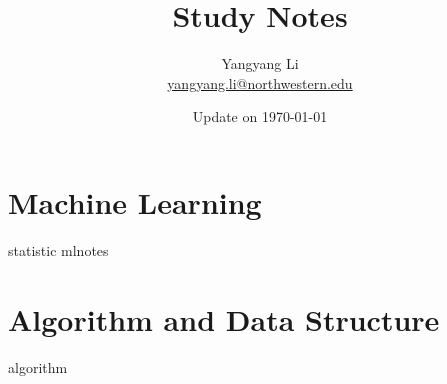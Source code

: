 \documentclass{scinote}
\begin{document}
\title{\bf \huge Study Notes}
\author{Yangyang Li \\ \href{mailto:yangyang.li@northwestern.edu}{yangyang.li@northwestern.edu}}

\date{Update on \today}
\maketitle
\setcounter{tocdepth}{2}
\setcounter{minitocdepth}{1}

\begin{multicols}{2}
	\dominitoc%
	\adjustmtc[2]%
	\tableofcontents
	\label{toc-contents}
\end{multicols}

\listoffigures
\begin{multicols}{2}
	\listoftheorems[ignoreall,show={theorem}]
\end{multicols}

\renewcommand{\listtheoremname}{List of Definitions}
\begin{multicols}{2}
	\listoftheorems[ignoreall,show={definition}]
\end{multicols}

\printglossaries


\mainmatter %


\part{Machine Learning}
{statistic}
{mlnotes}

\part{Algorithm and Data Structure}
{algorithm}
\end{document}
